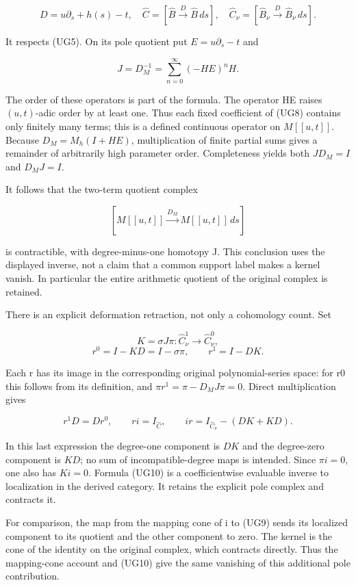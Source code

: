 \[
D=u\partial_s+h(s)-t,
\quad\widehat C=[\widehat B\xrightarrow D\widehat B\,ds],
\quad\widehat C_\nu=[\widehat B_\nu\xrightarrow D\widehat B_\nu\,ds].
\tag{UG7}
\]

It respects (UG5). On its pole quotient put \(E=u\partial_s-t\) and

\[
\boxed{J=D_M^{-1}=\sum_{n=0}^\infty(-HE)^nH.}
\tag{UG8}
\]

The order of these operators is part of the formula. The operator HE raises \((u,t)\)-adic order by at least one. Thus each fixed coefficient of (UG8) contains only finitely many terms; this is a defined continuous operator on \(M[[u,t]]\). Because \(D_M=M_h(I+HE)\), multiplication of finite partial sums gives a remainder of arbitrarily high parameter order. Completeness yields both \(J D_M=I\) and \(D_M J=I\).

It follows that the two-term quotient complex

\[
[M[[u,t]]\xrightarrow{D_M}M[[u,t]]\,ds]
\tag{UG9}
\]

is contractible, with degree-minus-one homotopy J. This conclusion uses the displayed inverse, not a claim that a common support label makes a kernel vanish. In particular the entire arithmetic quotient of the original complex is retained.

There is an explicit deformation retraction, not only a cohomology count. Set

\[
K=\sigma J\pi:\widehat C_\nu^1\longrightarrow\widehat C_\nu^0,
\] \[
r^0=I-KD=I-\sigma\pi,\qquad r^1=I-DK.
\tag{UG10}
\]

Each r has its image in the corresponding original polynomial-series space: for r0 this follows from its definition, and \(\pi r^1=\pi-D_M J\pi=0\). Direct multiplication gives

\[
r^1D=Dr^0,\qquad ri=I_{\widehat C},\qquad
ir=I_{\widehat C_\nu}-(DK+KD).
\tag{UG11}
\]

In this last expression the degree-one component is \(DK\) and the degree-zero component is \(KD\); no sum of incompatible-degree maps is intended. Since \(\pi i=0\), one also has \(Ki=0\). Formula (UG10) is a coefficientwise evaluable inverse to localization in the derived category. It retains the explicit pole complex and contracts it.

For comparison, the map from the mapping cone of i to (UG9) sends its localized component to its quotient and the other component to zero. The kernel is the cone of the identity on the original complex, which contracts directly. Thus the mapping-cone account and (UG10) give the same vanishing of this additional pole contribution.

